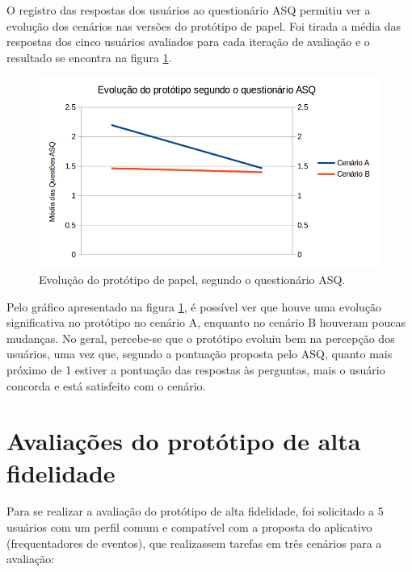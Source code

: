       O registro das respostas dos usuários ao questionário ASQ permitiu ver a evolução dos cenários nas versões do 
      protótipo de papel. Foi tirada a média das respostas dos cinco usuários avaliados para cada iteração de avaliação
      e o resultado se encontra na figura \ref{evolucao_prototipo_papel_ASQ}.
      
      \begin{figure}[!htpb]
	\centering
	\includegraphics[scale=0.35]{editaveis/figuras/evolucao_prototipo_papel_ASQ}
	\caption[Evolução do protótipo de papel, segundo o questionário ASQ]
	  {Evolução do protótipo de papel, segundo o questionário ASQ.}
	\label{evolucao_prototipo_papel_ASQ}
      \end{figure}
      
      Pelo gráfico apresentado na figura \ref{evolucao_prototipo_papel_ASQ}, é possível ver que houve uma evolução significativa
      no protótipo no cenário A, enquanto no cenário B houveram poucas mudanças. No geral, percebe-se que o protótipo evoluiu
      bem na percepção dos usuários, uma vez que, segundo a pontuação proposta pelo ASQ, quanto mais próximo de 1 estiver
      a pontuação das respostas às perguntas, mais o usuário concorda e está satisfeito com o cenário.
  
  \vfill
  \pagebreak
  \section{Avaliações do protótipo de alta fidelidade}
    
      Para se realizar a avaliação do protótipo de alta fidelidade, foi solicitado a 5 usuários com um perfil comum
      e compatível com a proposta do aplicativo (frequentadores de eventos), que realizassem tarefas em 
      três cenários para a avaliação:
    
